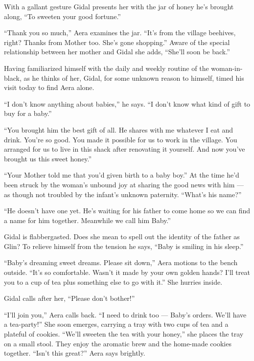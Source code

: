 \documentclass[twoside,11pt,openany]{book}
\begin{document}
With a gallant gesture Gidal presents her with the jar of honey he's brought along, ``To sweeten your good
fortune.''

``Thank you so much,'' Aera examines the jar. ``It's from the village beehives,
right? Thanks from Mother too. She's gone shopping.'' Aware of the special relationship between her mother
and Gidal she adds, ``She'll soon be back.''

Having familiarized himself with the daily and weekly routine of the
woman-in-black, as he thinks of her, Gidal, for
some unknown reason to himself, timed his visit today to find Aera alone.

 ``I don't know anything about babies,'' he says. ``I don't know what kind of
gift to buy for a baby.''

``You brought him the best gift of all. He shares with me whatever I eat and drink. You're so good. You
made it possible{ }for us to work in the village. You arranged for us to live
in this shack after renovating it yourself. And now you've brought us this sweet honey.''

``Your Mother told me that you'd given birth to a baby
boy.'' At the time he'd been struck by the woman's unbound joy at sharing the good news with him --- as
though not troubled by the infant's unknown paternity. ``What's his
name?''

``He doesn't have one yet. He's waiting for his father to come home so we can find a name for him together.
Meanwhile we call him Baby.''

Gidal is flabbergasted. Does she mean to spell out the identity of the father as Glin? To relieve himself from the
tension he says, ``Baby is smiling in his sleep.''

``Baby's dreaming sweet dreams. Please sit down,'' Aera motions to the bench
outside. ``It's so comfortable. Wasn't it made by your own
golden hands? I'll treat you to a cup of tea plus something else to go with it.'' She hurries inside.

Gidal calls after her, ``Please don't bother!''

``I'll join you,'' Aera calls back. ``I need to drink too --- Baby's orders. We'll
have a tea-party!'' She soon emerges, carrying a tray with two cups of tea and a plateful of cookies.
``We'll sweeten the tea with your honey,'' she
places the tray on a small stool. They enjoy the aromatic brew and the home-made cookies together. ``Isn't
this great?'' Aera says brightly.
\end{document}

